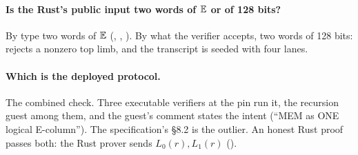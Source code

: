 \paragraph{Is the Rust's public input two words of $\mathbb{E}$ or of 128 bits?} By type two words of
$\mathbb{E}$ (\code{[F192; 2]}, , ). By what the verifier accepts,
two words of 128 bits:  rejects a nonzero top limb, and the transcript is
seeded with four lanes.

\paragraph{Which is the deployed protocol.} The combined check. Three executable verifiers at the
pin run it, the recursion guest among them, and the guest's comment states the intent (``MEM as
ONE logical E-column''). The specification's §8.2 is the outlier. An honest Rust proof passes
both: the Rust prover sends $L_0(r), L_1(r)$ ().
